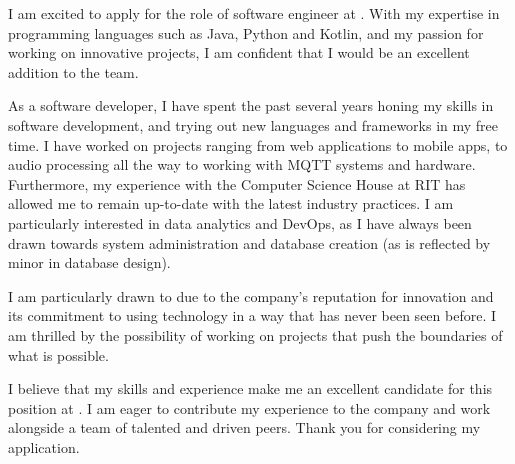 I am excited to apply for the role of software engineer at \company. With my expertise in programming languages such as Java, Python and Kotlin, and my passion for working on innovative projects, I am confident that I would be an excellent addition to the \company team.

As a software developer, I have spent the past several years honing my skills in software development, and trying out new languages and frameworks in my free time. I have worked on projects ranging from web applications to mobile apps, to audio processing all the way to working with MQTT systems and hardware. Furthermore, my experience with the Computer Science House at RIT has allowed me to remain up-to-date with the latest industry practices. I am particularly interested in data analytics and DevOps, as I have always been drawn towards system administration and database creation (as is reflected by minor in database design).

I am particularly drawn to \company due to the company's reputation for innovation and its commitment to using technology in a way that has never been seen before. I am thrilled by the possibility of working on projects that push the boundaries of what is possible.

I believe that my skills and experience make me an excellent candidate for this position at \company. I am eager to contribute my experience to the company and work alongside a team of talented and driven peers. Thank you for considering my application.
